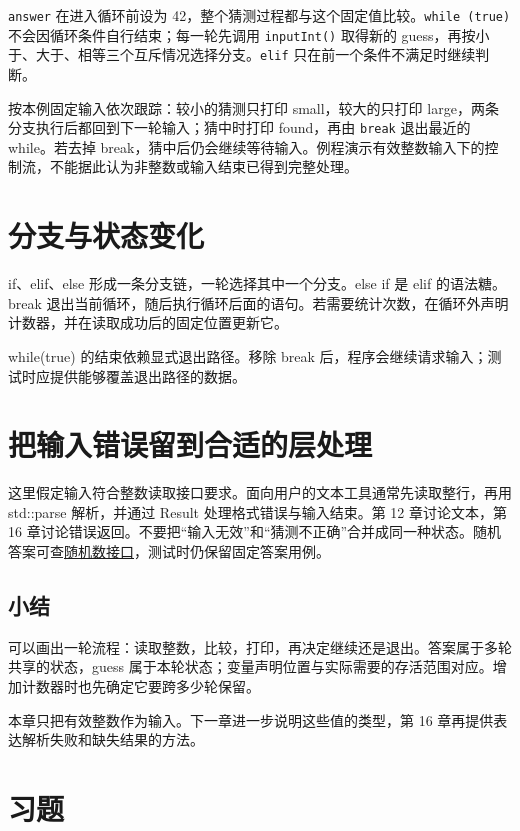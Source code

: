 \texttt{answer} 在进入循环前设为 42，整个猜测过程都与这个固定值比较。\texttt{while (\allowbreak{}true)\allowbreak{}} 不会因循环条件自行结束；每一轮先调用 \texttt{input\allowbreak{}Int(\allowbreak{})\allowbreak{}} 取得新的 guess，再按小于、大于、相等三个互斥情况选择分支。\texttt{elif} 只在前一个条件不满足时继续判断。

按本例固定输入依次跟踪：较小的猜测只打印 small，较大的只打印 large，两条分支执行后都回到下一轮输入；猜中时打印 found，再由 \texttt{break} 退出最近的 while。若去掉 break，猜中后仍会继续等待输入。例程演示有效整数输入下的控制流，不能据此认为非整数或输入结束已得到完整处理。

\section{分支与状态变化}

if、elif、else 形成一条分支链，一轮选择其中一个分支。else if 是 elif 的语法糖。break 退出当前循环，随后执行循环后面的语句。若需要统计次数，在循环外声明计数器，并在读取成功后的固定位置更新它。

while(true) 的结束依赖显式退出路径。移除 break 后，程序会继续请求输入；测试时应提供能够覆盖退出路径的数据。

\section{把输入错误留到合适的层处理}

这里假定输入符合整数读取接口要求。面向用户的文本工具通常先读取整行，再用 std::parse 解析，并通过 Result 处理格式错误与输入结束。第 12 章讨论文本，第 16 章讨论错误返回。不要把“输入无效”和“猜测不正确”合并成同一种状态。随机答案可查\href{https://github.com/rabbitc999/ChaLi/blob/master/doc/library/README.md}{随机数接口}，测试时仍保留固定答案用例。

\subsection*{小结}

可以画出一轮流程：读取整数，比较，打印，再决定继续还是退出。答案属于多轮共享的状态，guess 属于本轮状态；变量声明位置与实际需要的存活范围对应。增加计数器时也先确定它要跨多少轮保留。

本章只把有效整数作为输入。下一章进一步说明这些值的类型，第 16 章再提供表达解析失败和缺失结果的方法。

\section{习题}


